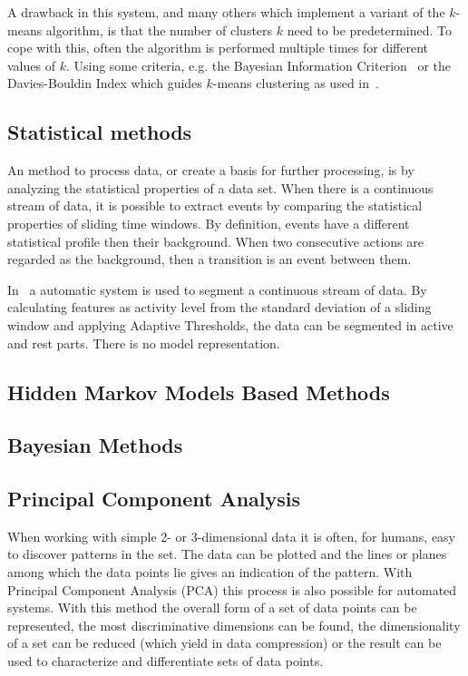 A drawback in this system, and many others which implement a variant of the $k$-means algorithm, is that the number of clusters $k$ need to be predetermined.
To cope with this, often the algorithm is performed multiple times for different values of $k$.
Using some criteria, e.g. the Bayesian Information Criterion~\cite{pelleg2000x} or the Davies-Bouldin Index which guides $k$-means clustering as used in~\cite{krause2003unsupervised}.

\subsection{Statistical methods}
An method to process data, or create a basis for further processing, is by analyzing the statistical properties of a data set.
When there is a continuous stream of data, it is possible to extract events by comparing the statistical properties of sliding time windows.
By definition, events have a different statistical profile then their background.
When two consecutive actions are regarded as the background, then a transition is an event between them.

In~\cite{guenterberg2009automatic} a automatic system is used to segment a continuous stream of data.
By calculating features as activity level from the standard deviation of a sliding window and applying Adaptive Thresholds, the data can be segmented in active and rest parts.
There is no model representation.

\subsection{Hidden Markov Models Based Methods}

\subsection{Bayesian Methods}

\subsection{Principal Component Analysis}
When working with simple 2- or 3-dimensional data it is often, for humans, easy to discover patterns in the set.
The data can be plotted and the lines or planes among which the data points lie gives an indication of the pattern.
With Principal Component Analysis (PCA) this process is also possible for automated systems.
With this method the overall form of a set of data points can be represented, the most discriminative dimensions can be found, the dimensionality of a set can be reduced (which yield in data compression) or the result can be used to characterize and differentiate sets of data points.

